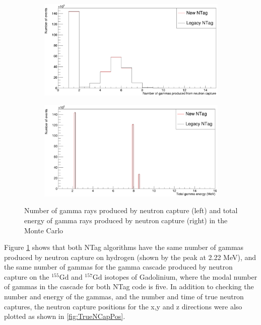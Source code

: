 \begin{figure}
    \centering
     \begin{subfigure}[b]{0.49\linewidth}
      \includegraphics[width=\linewidth]{Figures/NGamma.PNG}
     \end{subfigure}
     \begin{subfigure}[b]{0.49\linewidth}
       \includegraphics[width=\linewidth]{Figures/TotGammaE.PNG}
      \end{subfigure} 
      \caption{Number of gamma rays produced by neutron capture (left) and total energy of gamma rays produced by neutron capture (right) in the Monte Carlo}
      \label{fig:GammaPlots}
\end{figure}

Figure \ref{fig:GammaPlots} shows that both NTag algorithms have the same number of gammas produced by neutron capture on hydrogen (shown by the peak at 2.22 MeV), and the same number of gammas for the gamma cascade produced by neutron capture on the ${ }^{155} \mathrm{Gd}$ and 
${ }^{157} \mathrm{Gd}$ isotopes of Gadolinium, where the modal number of gammas in the cascade for both NTag code is five. In addition to checking the number and energy of the gammas, and the number and time of true neutron captures, the neutron capture positions for the x,y and z directions were also plotted as shown in \ref{fig:TrueNCapPos}.

